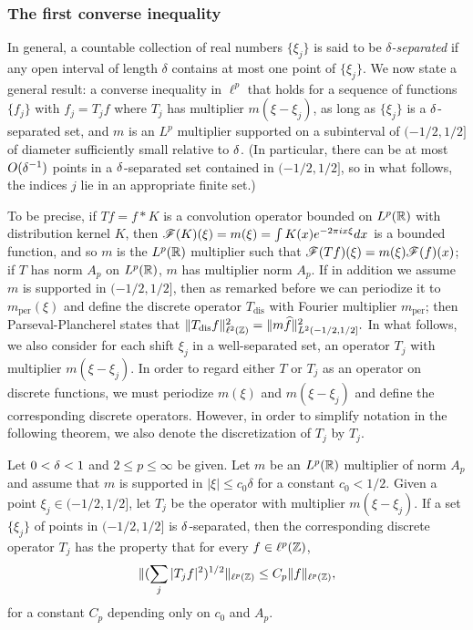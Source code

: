\documentclass[oneside,11pt]{amsart}
\begin{document}
\subsubsection{The first converse inequality}
 In general, a countable collection of real numbers $\{ \xi_j \}$ is said to be \emph{$\delta$-separated} if any open interval  of length $\delta$ contains at most one point of $\{\xi_j\}$. 
We now state a general result: a converse inequality in $\ell^p$ that holds for a sequence of functions $\{f_j\}$ with $f_j = T_j f$ where $T_j$ has multiplier $m(\xi - \xi_j)$, as long as $\{\xi_j\}$ is a $\delta$-separated set, and $m$ is an $L^p$ multiplier  supported on a subinterval of $(-1/2,1/2]$ of diameter sufficiently small relative to $\delta$.   (In particular, there can be at most $O(\delta^{-1})$ points in a  $\delta$-separated set contained in $(-1/2,1/2]$, so  in what follows,  the indices $j$  lie in an appropriate finite set.)

To be precise, if $Tf = f * K$ is a convolution operator bounded on $L^p(\mathbb{R})$ with distribution kernel $K$, then $\mathscr{F}(K)(\xi) = m(\xi) = \int K(x) e^{-2\pi i x\xi}dx$ is a bounded function, and so $m$ is the $L^p (\mathbb{R})$ multiplier such that $\mathscr{F}(Tf)(\xi) = m(\xi) \mathscr{F}(f)(x)$; if $T$ has norm $A_p$ on $L^p(\mathbb{R})$,   $m$ has multiplier norm $A_p$. If in addition we assume $m$ is supported in $(-1/2,1/2]$, then as remarked before we can periodize it to $m_{\mathrm{per}}(\xi)$ and define the discrete operator $T_{\mathrm{dis}}$ with Fourier multiplier $m_{\mathrm{per}}$; then Parseval-Plancherel states that $\|T_{\mathrm{dis}} f\|_{\ell^2(\mathbb{Z})}^2=\| m \widehat{f}\|^2_{L^2(-1/2,1/2]}.$
In what follows, we also consider for each shift $\xi_j$ in a well-separated set, an operator $T_j$ with multiplier $m(\xi-\xi_j)$. In order to regard either $T$ or $T_j$ as an operator on discrete functions, we must periodize $m(\xi)$ and $m(\xi - \xi_j)$ and define the corresponding discrete operators. However, in order to simplify notation in the following theorem, we also denote the discretization of $T_j$ by $T_j$.

 

  
\begin{thm}\label{thm_RdF_LP}
Let $0< \delta<1$ and $2 \leq p \leq \infty$ be given. 
Let $m$ be an $L^p(\mathbb{R})$ multiplier of norm $A_p$ and assume that $m$ is supported in $|\xi| \leq c_0 \delta$ for a constant $c_0 <1/2$.   Given a point $\xi_j \in (-1/2,1/2]$, let $T_j$ be the operator with multiplier $m(\xi - \xi_j)$.  If a set $\{\xi_j\}$ of points in $(-1/2,1/2]$ is  $\delta$-separated, then the corresponding discrete operator $T_j$ has the property that for every $f \in \ell^{p}(\mathbb{Z})$,
\[ \| ( \sum_j |T_j f|^2)^{1/2} \|_{\ell^p(\mathbb{Z})} \leq C_p \|f \|_{\ell^p(\mathbb{Z})},\]
for a constant $C_p$ depending only on $c_0$ and $A_p$.
\end{thm}
 
\end{document}
